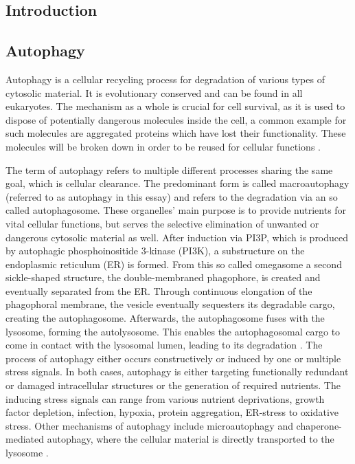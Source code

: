 \documentclass[12pt]{article} %
\begin{document}
\newpage %


\begin{linenumbers*}
\linenumbers
\section{Introduction} %

\subsection{Autophagy} Autophagy is a cellular recycling process for degradation of various types of cytosolic material. It is evolutionary conserved and can be found in all eukaryotes. The mechanism as a whole is crucial for cell survival, as it is used to dispose of potentially dangerous molecules inside the cell, a common example for such molecules are aggregated proteins which have lost their functionality. These molecules will be broken down in order to be reused for cellular functions \citep{Mercer2018}.

The term of autophagy refers to multiple different processes sharing the same goal, which is cellular clearance. The predominant form is called macroautophagy (referred to as autophagy in this essay) and refers to the degradation via an so called autophagosome. These organelles' main purpose is to provide nutrients for vital cellular functions, but serves the selective elimination of unwanted or dangerous cytosolic material as well.
After induction via PI3P, which is produced by autophagic phosphoinositide 3-kinase (PI3K), a substructure on the endoplasmic reticulum (ER) is formed. From this so called omegasome a second sickle-shaped structure, the double-membraned phagophore, is created and eventually separated from the ER. Through continuous elongation of the phagophoral membrane, the vesicle eventually sequesters its degradable cargo, creating the autophagosome. Afterwards, the autophagosome fuses with the lysosome, forming the autolysosome. This enables the autophagosomal cargo to come in contact with the lysosomal lumen, leading to its degradation \citep{RabanalRuiz2018, Mercer2018, Dikic2018}. 
The process of autophagy either occurs constructively or induced by one or multiple stress signals. In both cases, autophagy is either targeting functionally redundant or damaged intracellular structures or the generation of required nutrients. The inducing stress signals can range from various nutrient deprivations, growth factor depletion, infection, hypoxia, protein aggregation, ER-stress to oxidative stress.
Other mechanisms of autophagy include microautophagy and chaperone-mediated autophagy, where the cellular material is directly transported to the lysosome \citep{Shafei2017}. 


\end{linenumbers*}
\end{document}
